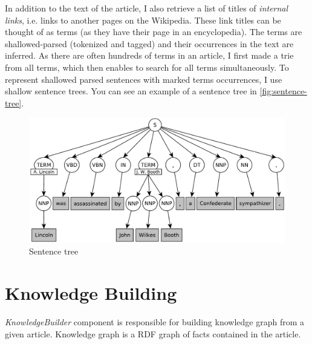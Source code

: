 \documentclass[12pt, twoside]{fithesis2}		%
\renewcommand{\_}{\leavevmode \kern0.07em\vbox{\hrule width0.4em}}
\begin{document}
In addition to the text of the article, I also retrieve a list of titles of \textit{internal links}, i.e. links to another pages on the Wikipedia.
These link titles can be thought of as terms (as they have their page in an encyclopedia).
The terms are shallowed-parsed (tokenized and tagged)
and their occurrences in the text are inferred.
As there are often hundreds of terms in an article,
I first made a trie from all terms, which then enables to search for all terms simultaneously.
To represent shallowed parsed sentences with marked terms occurrences,
I use shallow sentence trees.
You can see an example of a sentence tree in \autoref{fig:sentence-tree}.
\begin{figure}[h]
  \centering
  \includegraphics[width=\textwidth]{images/sentence-tree.pdf}
  \caption{Sentence tree}
  \label{fig:sentence-tree}
\end{figure}

\section{Knowledge Building}
\label{sec:smartoo-knowledge}

\textit{KnowledgeBuilder} component is responsible for building knowledge graph from a given article.
Knowledge graph is a RDF graph of facts contained in the article.

\end{document}
